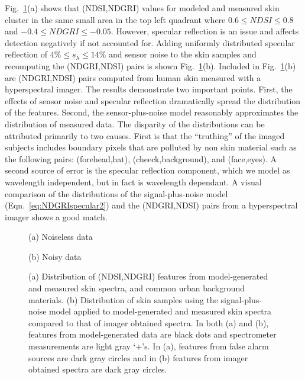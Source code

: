 \documentclass[10pt,journal,cspaper,compsoc]{IEEEtran}
\begin{document}
Fig.~\ref{X2:fig}(a) shows that (NDSI,NDGRI) values for modeled and measured skin cluster in the same small area in 
the top left quadrant where $0.6\leq NDSI \leq 0.8$ and $-0.4 \leq NDGRI \leq -0.05$. However, specular reflection 
is an issue and affects detection negatively if not accounted for. 
Adding uniformly distributed specular reflection of $4\% \leq s_{\lambda} \leq14\%$ and sensor noise 
to the skin samples and recomputing the (NDGRI,NDSI) pairs is shown Fig.~\ref{X2:fig}(b).  Included 
in Fig.~\ref{X2:fig}(b) are (NDGRI,NDSI) pairs computed from human skin measured with a hyperspectral imager. 
The results demonstrate two important points.  First, the effects of sensor noise and specular reflection 
dramatically spread the distribution of the features.  Second, the sensor-plus-noise model reasonably 
approximates the distribution of measured data.  The disparity of the distributions can be attributed primarily 
to two causes.  First is that the ``truthing'' of the imaged subjects includes boundary pixels that are polluted by 
non skin material such as the following pairs: (forehead,hat), (cheeck,background), and (face,eyes).  A second 
source of error is the specular reflection component, which we model as wavelength independent, but in fact is 
wavelength dependant. A visual comparison of the distributions of the signal-plus-noise model (Eqn.~\ref{eq:NDGRIspecular2}) 
and the (NDGRI,NDSI) pairs from a hyperspectral imager shows a good match. 

\begin{figure}
\begin{minipage}[b]{0.43\linewidth}
  \centering
 \centerline{}
  \centerline{(a) Noiseless data}\medskip
\end{minipage}
\hfill
\begin{minipage}[b]{0.43\linewidth}
  \centering
 \centerline{}
  \centerline{(b) Noisy data}\medskip
\end{minipage}
\vspace{-0.5cm}
\caption{(a) Distribution of (NDSI,NDGRI) features from model-generated and measured skin spectra, and common urban background materials.
(b) Distribution of skin samples using the signal-plus-noise model applied to model-generated and measured skin spectra compared 
to that of imager obtained spectra.  In both (a) and (b), features from model-generated data are black dots and spectrometer measurements are light 
gray `+'s.  In (a), features from false alarm sources are dark gray circles and in (b) features from imager obtained spectra are dark gray circles.}
\label{X2:fig}
%
\end{figure}
\end{document}
